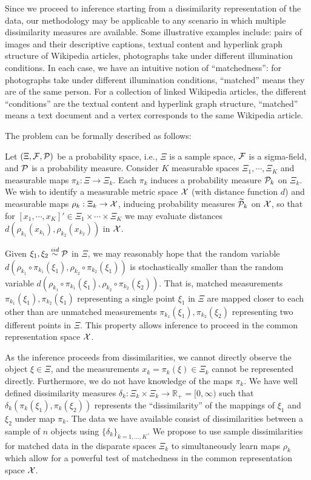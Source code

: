 \documentclass[12pt,oneside,final]{thesis}
\begin{document}
		Since we proceed to inference starting from a dissimilarity representation of the data, our methodology may be applicable to any scenario in which multiple dissimilarity measures are available.  Some illustrative examples include:  pairs of images and their descriptive captions,  textual content  and  hyperlink graph
structure of  Wikipedia  articles, photographs take under different illumination conditions. In each case, we have an intuitive notion of ``matchedness'': for photographs take under different illumination conditions, ``matched'' means they are of the same person. For a collection of linked Wikipedia articles, the different ``conditions''  are  the textual content and hyperlink graph structure, ``matched'' means a text document and  a vertex  corresponds to the same Wikipedia article. 

 
The problem can be formally described as follows:


Let $(\Xi,\mathcal{F},\mathcal{P})$ be a probability space,
i.e., $\Xi$ is a sample space, $\mathcal{F}$ is a sigma-field,
and $\mathcal{P}$ is a probability measure.
Consider $K$ measurable spaces $\Xi_1,\cdots,\Xi_K$ 
and measurable maps $\pi_k:\Xi \to \Xi_k$.
Each $\pi_k$ induces a probability measure $\mathcal{P}_k$ on $\Xi_k$.
We wish to identify a measurable metric space $\mathcal{X}$
(with distance function $d$)
and measurable maps $\rho_k: \Xi_k \to \mathcal{X}$,
inducing probability measures $\widetilde{\mathcal{P}}_k$ on $\mathcal{X}$,
so that for $[x_1,\cdots,x_K]' \in \Xi_1 \times \cdots \times \Xi_K$
we may evaluate distances $d(\rho_{k_1}(x_{k_1}),\rho_{k_2}(x_{k_2}))$ in $\mathcal{X}$.


Given $\xi_1,\xi_2 \stackrel{iid}{\sim} \mathcal{P}$ in $\Xi$,
we may reasonably hope that the random variable
$d(\rho_{k_1}\circ\pi_{k_1}(\xi_1),\rho_{k_2}\circ\pi_{k_2}(\xi_1))$
is stochastically smaller than the random variable
$d(\rho_{k_1}\circ\pi_{k_1}(\xi_1),\rho_{k_2}\circ\pi_{k_2}(\xi_2))$.
That is, matched measurements 
$\pi_{k_1}(\xi_1),\pi_{k_2}(\xi_1)$
representing a single point $\xi_1$ in $\Xi$
are mapped closer to each other than are
unmatched measurements 
$\pi_{k_1}(\xi_1),\pi_{k_2}(\xi_2)$
representing two different points in $\Xi$.
This property allows inference to proceed in the common representation space $\mathcal{X}$.


As the inference proceeds from dissimilarities, we cannot directly observe the object
 $\xi \in \Xi$,  and the measurements $x_k = \pi_k(\xi) \in \Xi_k$ cannot be represented directly. Furthermore, we do not have knowledge of the maps $\pi_k$.
 We have well defined dissimilarity measures
$\delta_k:\Xi_k \times \Xi_k \to \mathbb{R}_+ = [0,\infty)$
such that $\delta_k( \pi_k(\xi_1) , \pi_k(\xi_2) )$
represents the ``dissimilarity'' of  the mappings of $\xi_1$ and $\xi_2$
under map $\pi_k$.
The data we have  available consist of dissimilarities between a sample of $n$ objects using $\{\delta_k\}_{k=1,\ldots,K}$.
We propose to use sample dissimilarities for matched data in the disparate spaces $\Xi_k$
to simultaneously learn maps $\rho_k$ which allow for a powerful test of matchedness
in the common representation space $\mathcal{X}$.
\end{document}
